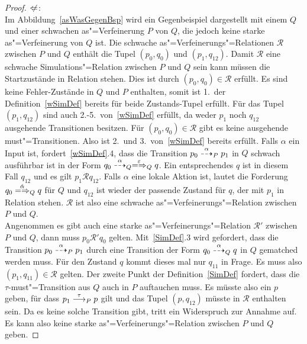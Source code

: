 \begin{proof}
  \glqq $\hspace{0.1cm}\not\hspace{-0.1cm}\Leftarrow$\grqq{}:\\
  Im Abbildung~\ref{asWasGegenBsp} wird ein Gegenbeispiel dargestellt mit einem
  \MEIO{} $Q$ und einer schwachen as"=Verfeinerung $P$ von $Q$, die jedoch
  keine starke as"=Verfeinerung von $Q$ ist. Die schwache
  as"=Verfeinerungs"=Relationen $\mathcal{R}$ zwischen $P$ und $Q$ enthält die
  Tupel $(p_0,q_0)$ und $(p_1,q_{12})$. Damit $\mathcal{R}$ eine schwache
  Simulations"=Relation zwischen $P$ und $Q$ sein kann müssen die Startzustände
  in Relation stehen. Dies ist durch $(p_0,q_0)\in \mathcal{R}$ erfüllt.
  Es sind keine Fehler-Zustände in $Q$ und $P$ enthalten, somit ist 1.\ der
  Definition~\ref{wSimDef} bereits für beide Zustands-Tupel erfüllt. Für das
  Tupel $(p_1,q_{12})$ sind auch 2.-5.\ von~\ref{wSimDef} erfüllt, da weder
  $p_1$ noch $q_{12}$ ausgehende Transitionen besitzen. Für $(p_0,q_0)\in
  \mathcal{R}$ gibt es keine ausgehende must"=Transitionen. Also ist 2.\ und
  3.\ von~\ref{wSimDef} bereits erfüllt. Falls $\alpha$ ein Input ist,
  fordert~\ref{wSimDef}.4, dass die Transition $p_0 \may[\alpha]_P p_1$ in $Q$
  schwach ausführbar ist in der Form $q_0 \may[\alpha]_Q
  \weakmay[\varepsilon]_Q q$. Ein entsprechendes $q$ ist in diesem Fall
  $q_{12}$ und es gilt $p_1 \mathcal{R} q_{12}$. Falls $\alpha$ eine lokale
  Aktion ist, lautet die Forderung $q_0 \weakmay[\hat{\alpha}]_Q q$ für $Q$ und
  $q_{12}$ ist wieder der passende Zustand für $q$, der mit $p_1$ in Relation
  stehen. $\mathcal{R}$ ist also eine schwache as"=Verfeinerungs"=Relation
  zwischen $P$ und $Q$.\\
  Angenommen es gibt auch eine starke as"=Verfeinerungs"=Relation
  $\mathcal{R}'$ zwischen $P$ und $Q$, dann muss $p_0 \mathcal{R}' q_0$
  gelten. Mit~\ref{SimDef}.3 wird gefordert, dass die Transition $p_0
  \may[\alpha]_P p_1$ durch eine Transition der Form $q_0 \may[\alpha]_Q q$
  in $Q$ gematched werden muss. Für den Zustand $q$ kommt dieses mal nur
  $q_{11}$ in Frage. Es muss also $(p_1,q_{11})\in \mathcal{R}$ gelten. Der
  zweite Punkt der Definition~\ref{SimDef} fordert, dass die
  $\tau$-must"=Transition aus $Q$ auch in $P$ auftauchen muss. Es müsste also
  ein $p$ geben, für dass $p_1 \must[\tau]_P p$ gilt und das Tupel $(p,q_{12})$
  müsste in $\mathcal{R}$ enthalten sein. Da es keine solche Transition gibt,
  tritt ein Widerspruch zur Annahme auf. Es kann also keine starke
  as"=Verfeinerungs"=Relation zwischen $P$ und $Q$ geben.


\end{proof}

